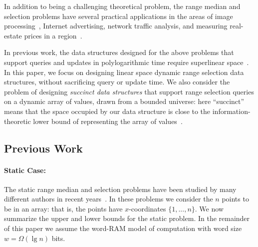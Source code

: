 \documentclass{llncs}
\begin{document}
In addition to being a challenging theoretical problem, the range
median and selection problems have several practical applications in
the areas of image processing~\cite{GW93}, Internet advertising,
network traffic analysis, and measuring real-estate prices in a
region~\cite{HM08}.

In previous work, the data structures designed for the above problems
that support queries and updates in polylogarithmic time require
superlinear space~\cite{BGJS10}.  In this paper, we focus on designing
linear space dynamic range selection data structures, without
sacrificing query or update time.  We also consider the problem of
designing \emph{succinct data structures} that support range selection
queries on a dynamic array of values, drawn from a bounded universe:
here ``succinct'' means that the space occupied by our data structure
is close to the information-theoretic lower bound of representing the
array of values~\cite{J89}.

\subsection{Previous Work\label{sec:previousresults}}



\paragraph{Static Case:}

The static range median and selection problems have been studied by
many different authors in recent
years~\cite{BKMT05,KMS05,HM08,P08,PG09,GPT09,GS09,BJ09,BGJS10,JL11}.
In these problems we consider the $n$ points to be in an array: that
is, the points have $x$-coordinates $\{1, ..., n\}$.  We now summarize
the upper and lower bounds for the static problem.  In the remainder
of this paper we assume the word-RAM model of computation with word
size $w = \Omega(\lg n)$ bits.
\end{document}
